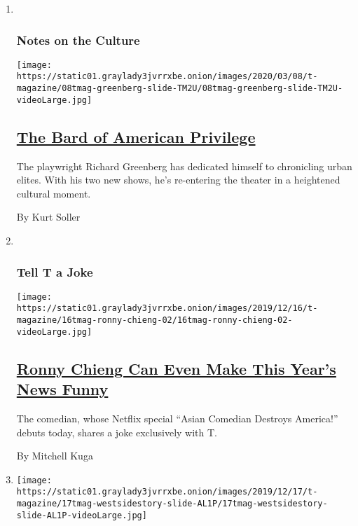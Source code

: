 \begin{enumerate}
\def\labelenumi{\arabic{enumi}.}
\item ~
  \hypertarget{notes-on-the-culture}{%
  \subsubsection{Notes on the Culture}\label{notes-on-the-culture}}

  \texttt{[image: https://static01.graylady3jvrrxbe.onion/images/2020/03/08/t-magazine/08tmag-greenberg-slide-TM2U/08tmag-greenberg-slide-TM2U-videoLarge.jpg]}

  \hypertarget{the-bard-of-american-privilege}{%
  \subsection{\texorpdfstring{\href{/2020/03/03/t-magazine/richard-greenberg-playwright.html}{The
  Bard of American
  Privilege}}{The Bard of American Privilege}}\label{the-bard-of-american-privilege}}

  The playwright Richard Greenberg has dedicated himself to chronicling
  urban elites. With his two new shows, he's re-entering the theater in
  a heightened cultural moment.

  By Kurt Soller
\item ~
  \hypertarget{tell-t-a-joke}{%
  \subsubsection{Tell T a Joke}\label{tell-t-a-joke}}

  \texttt{[image: https://static01.graylady3jvrrxbe.onion/images/2019/12/16/t-magazine/16tmag-ronny-chieng-02/16tmag-ronny-chieng-02-videoLarge.jpg]}

  \hypertarget{ronny-chieng-can-even-make-this-years-news-funny}{%
  \subsection{\texorpdfstring{\href{/2019/12/17/t-magazine/ronny-chieng.html}{Ronny
  Chieng Can Even Make This Year's News
  Funny}}{Ronny Chieng Can Even Make This Year's News Funny}}\label{ronny-chieng-can-even-make-this-years-news-funny}}

  The comedian, whose Netflix special ``Asian Comedian Destroys
  America!'' debuts today, shares a joke exclusively with T.

  By Mitchell Kuga
\item
  \texttt{[image: https://static01.graylady3jvrrxbe.onion/images/2019/12/17/t-magazine/17tmag-westsidestory-slide-AL1P/17tmag-westsidestory-slide-AL1P-videoLarge.jpg]}


\end{enumerate}
